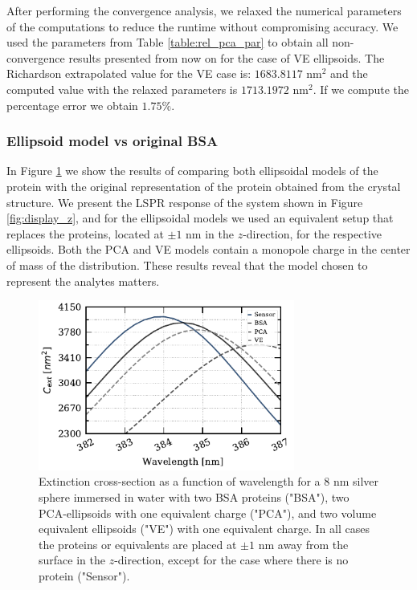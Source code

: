 After performing the convergence analysis, we relaxed the numerical parameters of the computations to reduce the runtime without 
compromising accuracy. We used the parameters from Table \ref{table:rel_pca_par} to obtain all non-convergence results presented from 
now on for the case of VE ellipsoids. The Richardson extrapolated value for the VE case is: $1683.8117$ nm$^2$ and the computed value with 
the relaxed parameters is $1713.1972$ nm$^2$. If we compute the percentage error we obtain $1.75 \%$.

\subsubsection{Ellipsoid model vs original BSA}\label{sssec:ell_mod_comp}

In Figure \ref{fig:2pz_ell_resp} we show the results of comparing both ellipsoidal models of the protein with the 
original representation of the protein obtained from the crystal structure. We present the LSPR response 
of the system shown in Figure \ref{fig:display_z}, and for the ellipsoidal models we used an equivalent 
setup that replaces the proteins, located at $\pm 1$ nm in the $z$-direction, for the respective ellipsoids.
Both the PCA and VE models contain a monopole charge in the center of mass of the distribution. These results reveal 
that the model chosen to represent the analytes matters.

\begin{figure} %
    \centering
    \includegraphics[width=0.75\textwidth]{two_ell_analysis.pdf} 
    \caption{Extinction cross-section as a function of wavelength for a 8 nm silver sphere immersed 
    in water with two BSA proteins ("BSA"), two PCA-ellipsoids with one equivalent charge ("PCA"), and two
    volume equivalent ellipsoids ("VE") with one equivalent charge. In all cases the proteins or equivalents
    are placed at $\pm 1$ nm away from the surface in the $z$-direction, except for the case where there is 
    no protein ("Sensor").}
    \label{fig:2pz_ell_resp}
 \end{figure}

